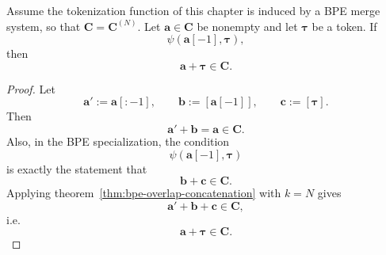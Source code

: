 \begin{corollary}
    \label{cor:bpe-last-pair-extension}
    Assume the tokenization function of this chapter is induced by a BPE merge system, so that
    $\mathbf{C} = \mathbf{C}^{(N)}$.
    Let $\mathbf{a} \in \mathbf{C}$ be nonempty and let $\boldsymbol{\tau}$ be a token.
    If
    \[
    \psi(\mathbf{a}[-1], \boldsymbol{\tau}),
    \]
    then
    \[
    \mathbf{a}+\boldsymbol{\tau} \in \mathbf{C}.
    \]
\end{corollary}
\begin{proof}
    Let
    \[
    \mathbf{a}' := \mathbf{a}[:-1],
    \qquad
    \mathbf{b} := [\mathbf{a}[-1]],
    \qquad
    \mathbf{c} := [\boldsymbol{\tau}].
    \]
    Then
    \[
    \mathbf{a}'+\mathbf{b} = \mathbf{a} \in \mathbf{C}.
    \]
    Also, in the BPE specialization, the condition
    \[
    \psi(\mathbf{a}[-1], \boldsymbol{\tau})
    \]
    is exactly the statement that
    \[
    \mathbf{b}+\mathbf{c} \in \mathbf{C}.
    \]
    Applying theorem~\ref{thm:bpe-overlap-concatenation} with $k=N$ gives
    \[
    \mathbf{a}'+\mathbf{b}+\mathbf{c} \in \mathbf{C},
    \]
    i.e.
    \[
    \mathbf{a}+\boldsymbol{\tau} \in \mathbf{C}.
    \]
\end{proof}
